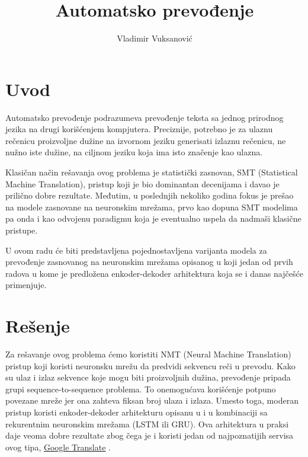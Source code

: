 \documentclass[a4paper]{article}
\title{Automatsko prevođenje}
\author{Vladimir Vuksanović}
\affil{Matematički fakultet, Beograd}
\date{}
\begin{document}
\maketitle

\tableofcontents

\newpage

\section{Uvod}

Automatsko prevođenje podrazumeva prevođenje teksta sa jednog prirodnog jezika na drugi korišćenjem kompjutera.
Preciznije, potrebno je za ulaznu rečenicu proizvoljne dužine na izvornom jeziku generisati izlaznu rečenicu, ne nužno iste dužine, na ciljnom jeziku koja ima isto značenje kao ulazna.

Klasičan način rešavanja ovog problema je statistički zasnovan, SMT (Statistical Machine Translation), pristup koji je bio dominantan decenijama i davao je prilično dobre rezultate. Međutim, u poslednjih nekoliko godina fokus je prešao na modele zasnovane na neuronskim mrežama, prvo kao dopuna SMT modelima pa onda i kao odvojenu paradigmu koja je eventualno uspela da nadmaši klasične pristupe.

U ovom radu će biti predstavljena pojednostavljena varijanta modela za prevođenje zasnovanog na neuronskim mrežama opisanog u \cite{sutskever2014sequence} koji jedan od prvih radova u kome je predložena enkoder-dekoder arhitektura koja se i danas najčešće primenjuje.

\section {Rešenje}

Za rešavanje ovog problema ćemo koristiti NMT (Neural Machine Translation) pristup koji koristi neuronsku mrežu da predvidi sekvencu reči u prevodu. 
Kako su ulaz i izlaz sekvence koje mogu biti proizvoljnih dužina, prevođenje pripada grupi sequence-to-sequence problema. To onemogućava korišćenje potpuno povezane mreže jer ona zahteva fiksan broj ulaza i izlaza. 
Umesto toga, moderan pristup koristi enkoder-dekoder arhitekturu opisanu u \cite{sutskever2014sequence} i \cite{cho2014learning} u kombinaciji sa rekurentnim neuronskim mrežama (LSTM ili GRU).
Ova arhitektura u praksi daje veoma dobre rezultate zbog čega je i koristi jedan od najpoznatijih servisa ovog tipa, \href{https://translate.google.com/}{Google Translate} \cite{wu2016googles}. 
\end{document}

